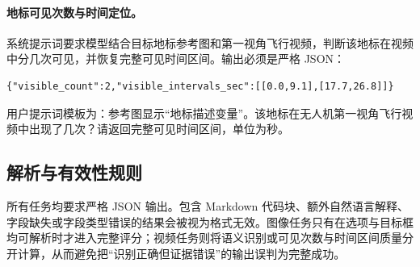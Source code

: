 \begin{thesisappendix}
\paragraph{地标可见次数与时间定位。}
系统提示词要求模型结合目标地标参考图和第一视角飞行视频，判断该地标在视频中分几次可见，并恢复完整可见时间区间。输出必须是严格 JSON：
\begin{verbatim}
{"visible_count":2,"visible_intervals_sec":[[0.0,9.1],[17.7,26.8]]}
\end{verbatim}
用户提示词模板为：参考图显示“地标描述变量”。该地标在无人机第一视角飞行视频中出现了几次？请返回完整可见时间区间，单位为秒。

\subsection{解析与有效性规则}

所有任务均要求严格 JSON 输出。包含 Markdown 代码块、额外自然语言解释、字段缺失或字段类型错误的结果会被视为格式无效。图像任务只有在选项与目标框均可解析时才进入完整评分；视频任务则将语义识别或可见次数与时间区间质量分开计算，从而避免把“识别正确但证据错误”的输出误判为完整成功。
\end{thesisappendix}

